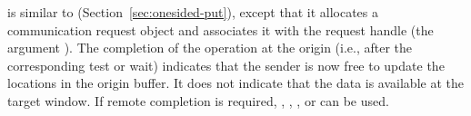 
 is similar to 
(Section~\ref{sec:onesided-put}), except that it
allocates a communication request object and associates it with the
request handle (the argument ). The completion of the
operation at the origin (i.e., after the corresponding test or wait) indicates that the sender is now free to
update the locations in the origin buffer. It does not indicate that
the data is available at the target window. If remote completion is
required, , ,
, or
 can be used.

